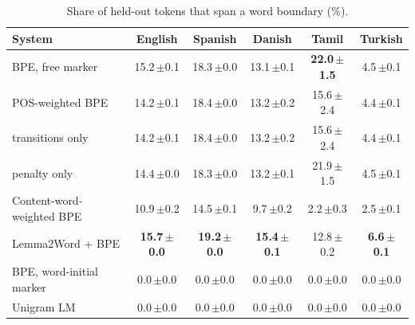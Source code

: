 \begin{table}[!ht]
\centering
\caption{Share of held-out tokens that span a word boundary (\%).}
\label{tab:cross}
\small
\setlength{\tabcolsep}{4pt}
\begin{tabular}{lccccc}
\toprule
System & English & Spanish & Danish & Tamil & Turkish \\
\midrule
BPE, free marker & 15.2\,{\scriptsize$\pm$0.1} & 18.3\,{\scriptsize$\pm$0.0} & 13.1\,{\scriptsize$\pm$0.1} & \textbf{22.0\,{\scriptsize$\pm$1.5}} & 4.5\,{\scriptsize$\pm$0.1} \\
POS-weighted BPE & 14.2\,{\scriptsize$\pm$0.1} & 18.4\,{\scriptsize$\pm$0.0} & 13.2\,{\scriptsize$\pm$0.2} & 15.6\,{\scriptsize$\pm$2.4} & 4.4\,{\scriptsize$\pm$0.1} \\
\quad transitions only & 14.2\,{\scriptsize$\pm$0.1} & 18.4\,{\scriptsize$\pm$0.0} & 13.2\,{\scriptsize$\pm$0.2} & 15.6\,{\scriptsize$\pm$2.4} & 4.4\,{\scriptsize$\pm$0.1} \\
\quad penalty only & 14.4\,{\scriptsize$\pm$0.0} & 18.3\,{\scriptsize$\pm$0.0} & 13.2\,{\scriptsize$\pm$0.1} & 21.9\,{\scriptsize$\pm$1.5} & 4.5\,{\scriptsize$\pm$0.1} \\
\addlinespace[2pt]
Content-word-weighted BPE & 10.9\,{\scriptsize$\pm$0.2} & 14.5\,{\scriptsize$\pm$0.1} & 9.7\,{\scriptsize$\pm$0.2} & 2.2\,{\scriptsize$\pm$0.3} & 2.5\,{\scriptsize$\pm$0.1} \\
Lemma2Word + BPE & \textbf{15.7\,{\scriptsize$\pm$0.0}} & \textbf{19.2\,{\scriptsize$\pm$0.0}} & \textbf{15.4\,{\scriptsize$\pm$0.1}} & 12.8\,{\scriptsize$\pm$0.2} & \textbf{6.6\,{\scriptsize$\pm$0.1}} \\
BPE, word-initial marker & 0.0\,{\scriptsize$\pm$0.0} & 0.0\,{\scriptsize$\pm$0.0} & 0.0\,{\scriptsize$\pm$0.0} & 0.0\,{\scriptsize$\pm$0.0} & 0.0\,{\scriptsize$\pm$0.0} \\
Unigram LM & 0.0\,{\scriptsize$\pm$0.0} & 0.0\,{\scriptsize$\pm$0.0} & 0.0\,{\scriptsize$\pm$0.0} & 0.0\,{\scriptsize$\pm$0.0} & 0.0\,{\scriptsize$\pm$0.0} \\
\bottomrule
\end{tabular}
\end{table}
